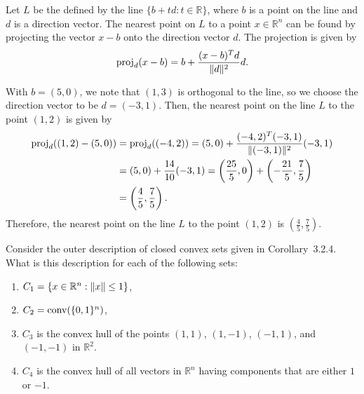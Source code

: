\documentclass[
  a4paper,
  12pt,
]{article}
\numberwithin{equation}{section}
\begin{document}
\begin{solution}
  Let $L$ be the defined by the line $\{ b + t d : t \in \mathbb{R} \}$, where $b$ is a point on the line and $d$ is a direction vector.
  The nearest point on $L$ to a point $x \in \mathbb{R}^n$ can be found by projecting the vector $x - b$ onto the direction vector $d$.
  The projection is given by
  \begin{equation}
    \mathrm{proj}_d (x - b) = b + \frac{(x - b)^T d}{\lVert d\rVert^2} d.
  \end{equation}

  With $b = (5, 0)$, we note that $(1, 3)$ is orthogonal to the line, so we choose the direction vector to be $d = (-3, 1)$.
  Then, the nearest point on the line $L$ to the point $(1, 2)$ is given by
  \begin{equation}
    \begin{split}
      \mathrm{proj}_d ((1, 2) - (5, 0)) &= \mathrm{proj}_d ((-4, 2))
      = (5, 0) + \frac{(-4, 2)^T (-3, 1)}{\lVert(-3, 1)\rVert^2} (-3, 1) \\
      &= (5, 0) + \frac{14}{10} (-3, 1)
      =\left(\frac{25}{5}, 0\right) + \left(-\frac{21}{5}, \frac{7}{5}\right) \\
      &= \left(\frac{4}{5}, \frac{7}{5}\right).
    \end{split}
  \end{equation}
  Therefore, the nearest point on the line $L$ to the point $(1, 2)$ is $\left(\frac{4}{5}, \frac{7}{5}\right)$.
\end{solution}

\begin{exercise}
  Consider the outer description of closed convex sets given in Corollary~3.2.4.
  What is this description for each of the following sets:
  \begin{enumerate}[label = (\emph{\roman*})]
    \item $C_1 = \{ x \in \mathbb{R}^n : \lVert x\rVert \leq 1 \}$,
    \item $C_2 = \operatorname*{conv}(\{0, 1\}^n)$,
    \item $C_3$ is the convex hull of the points $(1,1)$, $(1,-1)$, $(-1,1)$, and $(-1,-1)$ in $\mathbb{R}^2$.
    \item $C_4$ is the convex hull of all vectors in $\mathbb{R}^n$ having components that are either $1$ or $-1$.
  \end{enumerate}
\end{exercise}
\end{document}
